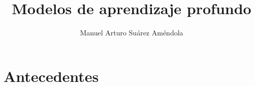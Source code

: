 \documentclass[11pt]{beamer}
\title[Seminario de UAM]
{Modelos de aprendizaje profundo}
\author[Suárez, M.A.]{Manuel Arturo Suárez Améndola}
\begin{document}
\section{Antecedentes}

\end{document}
